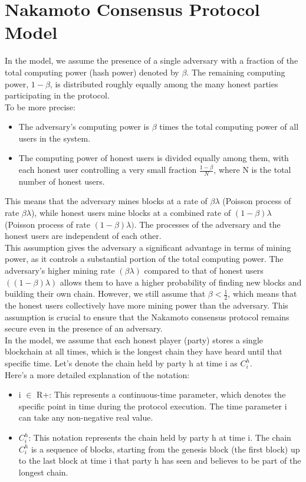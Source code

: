 \documentclass{report}
\begin{document}
\section{Nakamoto Consensus Protocol Model}
In the model, we assume the presence of a single adversary with a fraction of the total computing power (hash power) denoted by $\beta$. The remaining computing power, $1 - \beta$, is distributed roughly equally among the many honest parties participating in the protocol.\\
To be more precise:
\begin{itemize}
	\item The adversary's computing power is $\beta$ times the total computing power of all users in the system.
	\item The computing power of honest users is divided equally among them, with each honest user controlling a very small fraction $\frac{1 - \beta}{N}$, where N is the total number of honest users. 
\end{itemize}
This means that the adversary mines blocks at a rate of $\beta\lambda$ (Poisson process of rate $\beta\lambda$), while honest users mine blocks at a combined rate of $(1 - \beta)\lambda$ (Poisson process of rate $(1 - \beta)\lambda)$. The processes of the adversary and the honest users are independent of each other.\\
This assumption gives the adversary a significant advantage in terms of mining power, as it controls a substantial portion of the total computing power. The adversary's higher mining rate $(\beta\lambda)$ compared to that of honest users $((1 - \beta)\lambda)$ allows them to have a higher probability of finding new blocks and building their own chain. However, we still assume that $\beta < \frac{1}{2}$, which means that the honest users collectively have more mining power than the adversary. This assumption is crucial to ensure that the Nakamoto consensus protocol remains secure even in the presence of an adversary.\\
In the model, we assume that each honest player (party) stores a single blockchain at all times, which is the longest chain they have heard until that specific time. Let's denote the chain held by party h at time i as $C_{i}^{h}$.\\
Here's a more detailed explanation of the notation:\\
\begin{itemize}
	\item i $\in$ R+: This represents a continuous-time parameter, which denotes the specific point in time during the protocol execution. The time parameter i can take any non-negative real value.
	\item $C_{i}^{h}$: This notation represents the chain held by party h at time i. The chain $C_{i}^{h}$ is a sequence of blocks, starting from the genesis block (the first block) up to the last block at time i that party h has seen and believes to be part of the longest chain.
\end{itemize}
\end{document}
